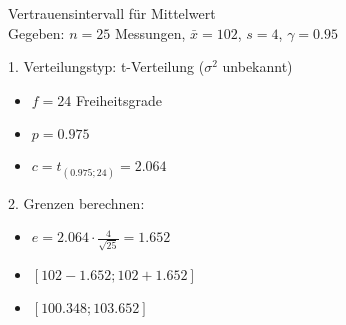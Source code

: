 \begin{example2}{Vertrauensintervall für Mittelwert}\\
Gegeben: $n=25$ Messungen, $\bar{x}=102$, $s=4$, $\gamma=0.95$

1. Verteilungstyp: t-Verteilung ($\sigma^2$ unbekannt)
   \begin{itemize}
     \item $f=24$ Freiheitsgrade
     \item $p=0.975$
     \item $c=t_{(0.975;24)}=2.064$
   \end{itemize}

2. Grenzen berechnen:
   \begin{itemize}
     \item $e=2.064 \cdot \frac{4}{\sqrt{25}}=1.652$
     \item $[102-1.652; 102+1.652]$
     \item $[100.348; 103.652]$
   \end{itemize}
\end{example2}